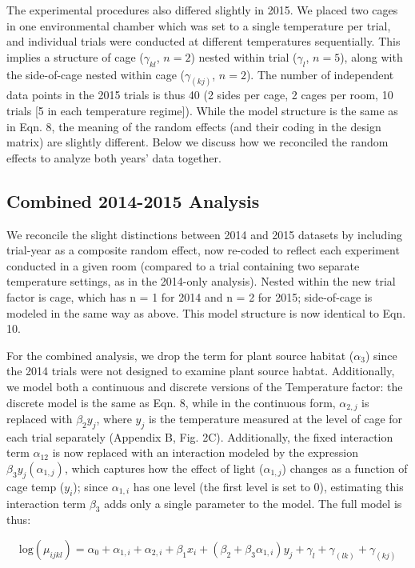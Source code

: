 \documentclass[11pt, oneside]{amsart}
\begin{document}
The experimental procedures also differed slightly in 2015. We placed two cages in one environmental chamber which was set to a single temperature per trial, and individual trials were conducted at different temperatures sequentially. This implies a structure of cage ($\gamma_{kl}$, $n=2$) nested within trial ($\gamma_{l}$, $n=5$), along with the side-of-cage nested within cage ($\gamma_{(kj)}$, $n=2$). The number of independent data points in the 2015 trials is thus 40 (2 sides per cage, 2 cages per room, 10 trials [5 in each temperature regime]). While the model structure is the same as in Eqn. 8, the meaning of the random effects (and their coding in the design matrix) are slightly different. Below we discuss how we reconciled the random effects to analyze both years' data together.

\subsection{Combined 2014-2015 Analysis}

We reconcile the slight distinctions between 2014 and 2015 datasets by including trial-year as a composite random effect, now re-coded to reflect each experiment conducted in a given room (compared to a trial containing two separate temperature settings, as in the 2014-only analysis). Nested within the new trial factor is cage, which has n = 1 for 2014 and n = 2 for 2015; side-of-cage is modeled in the same way as above. This model structure is now identical to Eqn. 10.

For the combined analysis, we drop the term for plant source habitat ($\alpha_3$) since the 2014 trials were not designed to examine plant source habtat. Additionally, we model both a continuous and discrete versions of the Temperature factor: the discrete model is the same as Eqn. 8, while in the continuous form, $\alpha_{2,j}$ is replaced with $\beta_2 y_j$, where $y_j$ is the temperature measured at the level of cage for each trial separately (Appendix B, Fig. 2C). Additionally, the fixed interaction term $\alpha_{12}$ is now replaced with an interaction modeled by the expression $\beta_3 y_j (\alpha_{1,j})$, which captures how the effect of light ($\alpha_{1,j}$) changes as a function of cage temp ($y_i$); since $\alpha_{1,i}$ has one level (the first level is set to 0), estimating this interaction term $\beta_3$ adds only a single parameter to the model. The full model is thus:

\begin{equation}
\text{log}(\mu_{ijkl}) = \alpha_0 + \alpha_{1,i} + \alpha_{2,i} + \beta_1 x_i + (\beta_2 + \beta_3\alpha_{1,i})y_j + \gamma_l + \gamma_{(lk)} + \gamma_{(kj)}
\end{equation}
\end{document}

